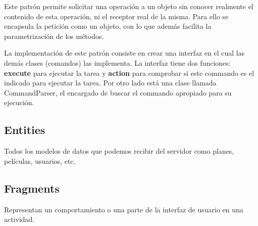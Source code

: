 Este patrón permite solicitar una operación a un objeto sin conocer realmente el contenido de esta operación, ni el receptor real de la misma. Para ello se encapsula la petición como un objeto, con lo que además facilita la parametrización de los métodos.

La implementación de este patrón consiste en crear una interfaz en el cual las demás clases (comandos) las implementa. La interfaz tiene dos funciones: \textbf{execute} para ejecutar la tarea y \textbf{action} para comprobar si este commando es el indicado para ejecutar la tarea. Por otro 
lado está una clase llamada CommandParser, el encargado de buscar el commando apropiado para su ejecución.

\subsection{Entities}
\label{makereference4.3.4}
Todos los modelos de datos que podemos recibir del servidor como planes, películas, usuarios, etc.

\subsection{Fragments}
\label{makereference4.3.5}
Representan un comportamiento o una parte de la interfaz de usuario en una actividad.

